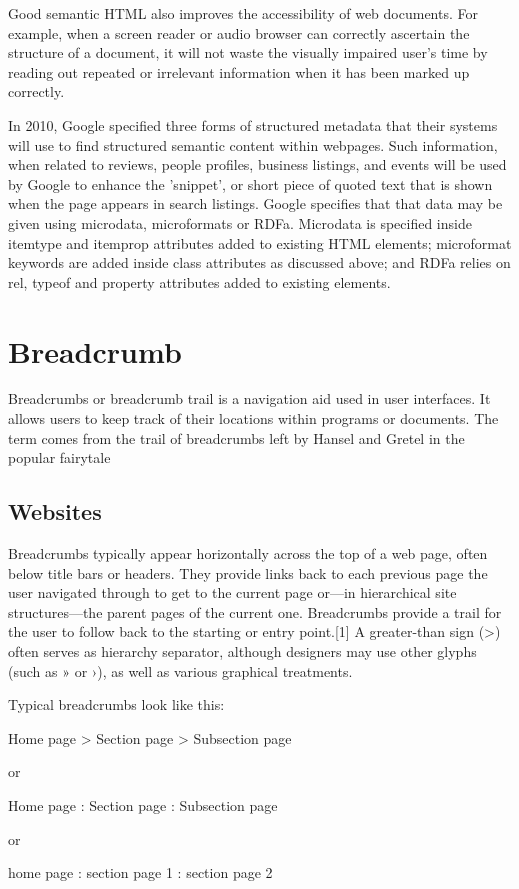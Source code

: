 Good semantic HTML also improves the accessibility of web documents. For example, when a screen reader or audio browser can correctly ascertain the structure of a document, it will not waste the visually impaired user's time by reading out repeated or irrelevant information when it has been marked up correctly.

In 2010, Google specified three forms of structured metadata that their systems will use to find structured semantic content within webpages. Such information, when related to reviews, people profiles, business listings, and events will be used by Google to enhance the 'snippet', or short piece of quoted text that is shown when the page appears in search listings. Google specifies that that data may be given using microdata, microformats or RDFa. Microdata is specified inside itemtype and itemprop attributes added to existing HTML elements; microformat keywords are added inside class attributes as discussed above; and RDFa relies on rel, typeof and property attributes added to existing elements.



\section{Breadcrumb}

Breadcrumbs or breadcrumb trail is a navigation aid used in user interfaces. It allows users to keep track of their locations within programs or documents. The term comes from the trail of breadcrumbs left by Hansel and Gretel in the popular fairytale

\subsection{Websites}

Breadcrumbs typically appear horizontally across the top of a web page, often below title bars or headers. They provide links back to each previous page the user navigated through to get to the current page or—in hierarchical site structures—the parent pages of the current one. Breadcrumbs provide a trail for the user to follow back to the starting or entry point.[1] A greater-than sign (>) often serves as hierarchy separator, although designers may use other glyphs (such as » or ›), as well as various graphical treatments.

Typical breadcrumbs look like this:

\begin{compactitem}
\item Home page > Section page > Subsection page

or

\item Home page : Section page : Subsection page

or

\item home page : section page 1 : section page 2
\end{compactitem}

